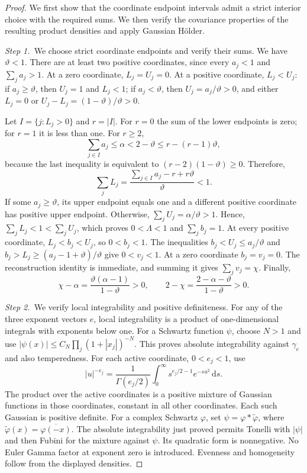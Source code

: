 \documentclass[12pt,oneside,openany]{book}
\numberwithin{equation}{section}
\theoremstyle{nogostyle}
\theoremstyle{definition}
\newcommand{\ud}{\,\mathrm{d}}
\begin{document}
\begin{proof}
  We first show that the coordinate endpoint intervals admit a strict interior
  choice with the required sums. We then verify the covariance properties of
  the resulting product densities and apply Gaussian Hölder.


  \medskip
  \noindent\textit{Step 1.~}We choose strict coordinate endpoints and verify
  their sums.
  We have $\vartheta < 1$. There are at least two positive coordinates, since
  every $a_j < 1$ and $\sum_j a_j > 1$. At a zero coordinate, $L_j = U_j = 0$.
  At a positive coordinate, $L_j < U_j$: if $a_j \ge \vartheta$, then $U_j = 1$
  and $L_j < 1$; if $a_j < \vartheta$, then $U_j = a_j/\vartheta > 0$, and
  either $L_j = 0$ or $U_j-L_j = (1-\vartheta)/\vartheta > 0$.

  Let $I = \{j:L_j>0\}$ and $r = |I|$. For $r = 0$ the sum of the lower
  endpoints is zero; for $r = 1$ it is less than one. For $r \ge 2$,
  \[
    \sum_{j\in I}a_j\le\alpha<2-\vartheta
    \le r-(r-1)\vartheta,
  \]
  because the last inequality is equivalent to $(r-2)(1-\vartheta) \ge 0$.
  Therefore,
  \[
    \sum_jL_j
    =\frac{\sum_{j\in I}a_j-r+r\vartheta}{\vartheta}<1.
  \]
  If some $a_j \ge \vartheta$, its upper endpoint equals one and a different
  positive coordinate has positive upper endpoint. Otherwise, $\sum_jU_j =
  \alpha/\vartheta > 1$. Hence, $\sum_jL_j < 1 < \sum_jU_j$, which proves $0 <
  \Lambda < 1$ and $\sum_jb_j = 1$. At every positive coordinate, $L_j < b_j <
  U_j$, so $0 < b_j < 1$. The inequalities $b_j < U_j \le a_j/\vartheta$ and
  $b_j > L_j \ge (a_j-1+\vartheta)/\vartheta$ give $0 < v_j < 1$. At a zero
  coordinate $b_j = v_j = 0$. The reconstruction identity is immediate, and
  summing it gives $\sum_jv_j = \chi$. Finally,
  \[
    \chi-\alpha=\frac{\vartheta(\alpha-1)}{1-\vartheta}>0,
    \qquad 2-\chi=\frac{2-\alpha-\vartheta}{1-\vartheta}>0.
  \]


  \medskip
  \noindent\textit{Step 2.~}We verify local integrability and positive
  definiteness.
  For any of the three exponent vectors $e$, local integrability is a product of
  one-dimensional integrals with exponents below one. For a Schwartz function
  $\psi$, choose $N > 1$ and use $|\psi(x)| \le C_N\prod_j(1+|x_j|)^{-N}$. This
  proves absolute integrability against $\gamma_e$ and also temperedness. For
  each active coordinate, $0 < e_j < 1$, use
  \[
    |u|^{-e_j}=\frac1{\Gamma(e_j/2)}
    \int_0^\infty s^{e_j/2-1}e^{-su^2}\ud s.
  \]
  The product over the active coordinates is a positive mixture of Gaussian
  functions in those coordinates, constant in all other coordinates. Each such
  Gaussian is positive definite. For a complex Schwartz $\varphi$, set $\psi =
  \varphi*\widetilde{\varphi}$, where $\widetilde{\varphi}(x) =
  \overline{\varphi(-x)}$. The absolute integrability just proved permits
  Tonelli with $|\psi|$ and then Fubini for the mixture against $\psi$. Its
  quadratic form is nonnegative. No Euler Gamma factor at exponent zero is
  introduced. Evenness and homogeneity follow from the displayed densities.



\end{proof}
\end{document}
